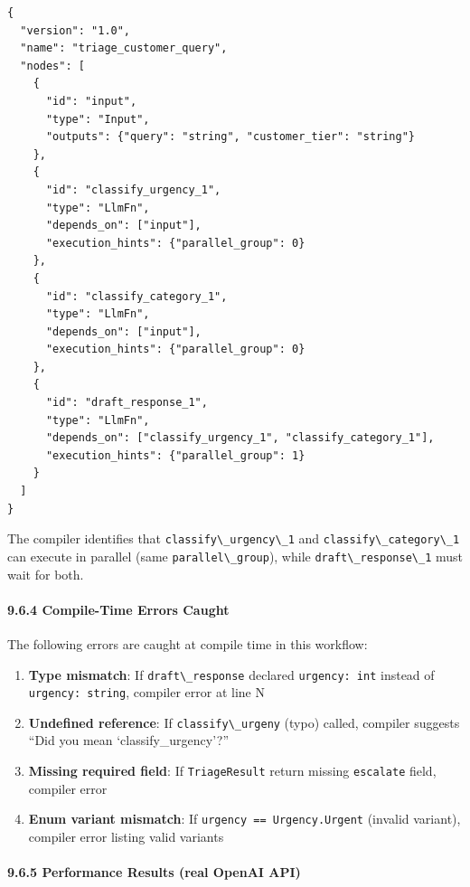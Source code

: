\documentclass[
]{article}
\newcommand{\passthrough}[1]{#1}
\providecommand{\tightlist}{%
  \setlength{\itemsep}{0pt}\setlength{\parskip}{0pt}}
\begin{document}
\begin{lstlisting}
{
  "version": "1.0",
  "name": "triage_customer_query",
  "nodes": [
    {
      "id": "input",
      "type": "Input",
      "outputs": {"query": "string", "customer_tier": "string"}
    },
    {
      "id": "classify_urgency_1",
      "type": "LlmFn",
      "depends_on": ["input"],
      "execution_hints": {"parallel_group": 0}
    },
    {
      "id": "classify_category_1",
      "type": "LlmFn",
      "depends_on": ["input"],
      "execution_hints": {"parallel_group": 0}
    },
    {
      "id": "draft_response_1",
      "type": "LlmFn",
      "depends_on": ["classify_urgency_1", "classify_category_1"],
      "execution_hints": {"parallel_group": 1}
    }
  ]
}
\end{lstlisting}

The compiler identifies that
\passthrough{\lstinline!classify\_urgency\_1!} and
\passthrough{\lstinline!classify\_category\_1!} can execute in parallel
(same \passthrough{\lstinline!parallel\_group!}), while
\passthrough{\lstinline!draft\_response\_1!} must wait for both.

\paragraph{9.6.4 Compile-Time Errors
Caught}\label{compile-time-errors-caught}

The following errors are caught at compile time in this workflow:

\begin{enumerate}
\def\labelenumi{\arabic{enumi}.}
\tightlist
\item
  \textbf{Type mismatch}: If \passthrough{\lstinline!draft\_response!}
  declared \passthrough{\lstinline!urgency: int!} instead of
  \passthrough{\lstinline!urgency: string!}, compiler error at line N
\item
  \textbf{Undefined reference}: If
  \passthrough{\lstinline!classify\_urgeny!} (typo) called, compiler
  suggests ``Did you mean `classify\_urgency'?''
\item
  \textbf{Missing required field}: If
  \passthrough{\lstinline!TriageResult!} return missing
  \passthrough{\lstinline!escalate!} field, compiler error
\item
  \textbf{Enum variant mismatch}: If
  \passthrough{\lstinline!urgency == Urgency.Urgent!} (invalid variant),
  compiler error listing valid variants
\end{enumerate}

\paragraph{9.6.5 Performance Results (real OpenAI
API)}\label{performance-results-real-openai-api}
\end{document}
